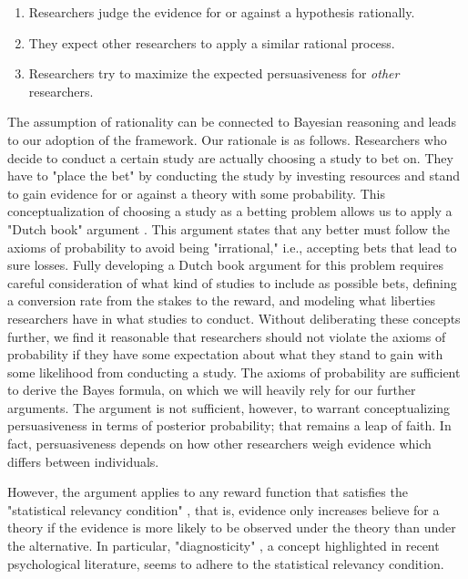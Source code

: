 \documentclass[jou,a4paper]{apa7}
\begin{document}
\begin{enumerate}
    \item Researchers judge the evidence for or against a hypothesis rationally.
    \item They expect other researchers to apply a similar rational process.
    \item Researchers try to maximize the expected persuasiveness for \textit{other} researchers.
\end{enumerate}

The assumption of rationality can be connected to Bayesian reasoning and leads to our adoption of the framework.
Our rationale is as follows.
Researchers who decide to conduct a certain study are actually choosing a study to bet on.
They have to "place the bet" by conducting the study by investing resources and stand to gain evidence for or against a theory with some probability.
This conceptualization of choosing a study as a betting problem allows us to apply a "Dutch book" argument \parencite{christensenCleverBookiesCoherent1991}.
This argument states that any better must follow the axioms of probability to avoid being "irrational," i.e., accepting bets that lead to sure losses.
Fully developing a Dutch book argument for this problem requires careful consideration of what kind of studies to include as possible bets, defining a conversion rate from the stakes to the reward, and modeling what liberties researchers have in what studies to conduct.
Without deliberating these concepts further, we find it reasonable that researchers should not violate the axioms of probability if they have some expectation about what they stand to gain with some likelihood from conducting a study.
The axioms of probability are sufficient to derive the Bayes formula, on which we will heavily rely for our further arguments.
The argument is not sufficient, however, to warrant conceptualizing persuasiveness in terms of posterior probability; that remains a leap of faith.
In fact, persuasiveness depends on how other researchers weigh evidence which differs between individuals.\par
However, the argument applies to any reward function that satisfies the "statistical relevancy condition" \parencite{wesleyc.salmonStatisticalExplanation1970,fetzerStatisticalExplanations1974}, that is, evidence only increases believe for a theory if the evidence is more likely to be observed under the theory than under the alternative. In particular, "diagnosticity" \parencite{fiedlerWhatConstitutesStrong2017,oberauerAddressingTheoryCrisis2019}, a concept highlighted in recent psychological literature, seems to adhere to the statistical relevancy condition. 
\end{document}
